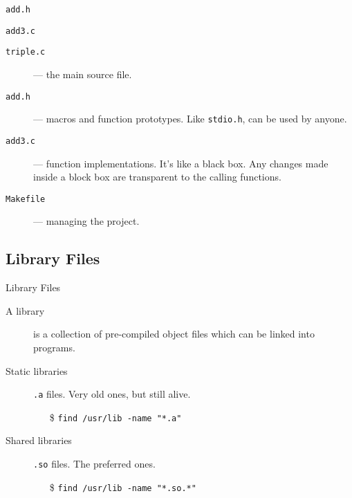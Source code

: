 \begin{minipage}[t]{.45\linewidth}
\begin{block}{\texttt{add.h}}
\end{block}
\end{minipage}\quad
\begin{minipage}[t]{.45\linewidth}
\begin{block}{\texttt{add3.c}}
\end{block}  
\end{minipage}

\begin{description}
\item[\texttt{triple.c}] --- the main source file.
\item[\texttt{add.h}] --- macros and function prototypes. Like \texttt{stdio.h}, can be
  used by anyone.
\item[\texttt{add3.c}] --- function implementations. It's like a black box. Any changes
  made inside a block box are transparent to the calling functions.
\item[\texttt{Makefile}] --- managing the project.
\end{description}

\subsection{Library Files}
\label{sec:library-files}

\begin{frame}{Library Files}
  \begin{description}
  \item[A library] is a collection of pre-compiled object files which can be linked into programs.
  \item[Static libraries] \alert{\texttt{.a}} files. Very old ones, but still alive.
    \begin{itemize}
    \item[\$] \texttt{find /usr/lib -name "*.a"}
    \end{itemize}
  \item[Shared libraries] \alert{\texttt{.so}} files. The preferred ones.
    \begin{itemize}
    \item[\$] \texttt{find /usr/lib -name "*.so.*"}
    \end{itemize}
  \end{description}
\end{frame}

